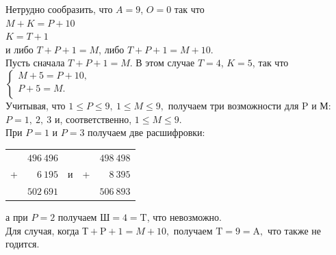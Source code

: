 \documentclass[2pt,twocolumn]{article}
\newcommand\tab[1][1cm]{\hspace*{#1}}
\begin{document}
\begin{flushleft}
\begin{table}[h]
    \endgroup
    \end{table}
    Нетрудно сообразить, что $A = 9$, $O = 0$ так что\\
    \tab \tab $M+K=P+10$\\
    \tab \tab$K = T+1$\\
    и либо $T+P+1=M$, либо $T+P+1=M+10.$\\
    \tab Пусть сначала $T+P+1=M.$ В этом случае $T=4$, $K=5$, так что
    \tab \tab $\left\{
        \begin{array}{ccc}
          M+5=P+10, \\
          P+5=M. \\
        \end{array}
      \right.$\\
    \tab Учитывая, что $1\leq P \leq 9,~1\leq M\leq 9,$ получаем три возможности для P и М: $P=1,~2,~3$ 
    и, соответственно, $1\leq M \leq 9.$\\
    \tab   При $P=1$ и $P=3$ получаем две расшифровки:\\
    \begin{table}[h]
        \begingroup
    \fontsize{7pt}{9pt}\selectfont
        \begin{tabular}{lrllr}
          & $496~496$ &   &   & $498~498$ \\
        + & $6~195$   & и & + & $8~395$   \\ \cline{2-2} \cline{5-5} 
          & $502~691$ &   &   & $506~893$
        \end{tabular}%
        \endgroup
    \end{table}
    а при $P=2$ получаем $\text{Ш} = 4 = \text{T}$, что невозможно.\\
    \tab Для случая, когда $\text{Т}+\text{P}+1=M+10,$ получаем $\text{T}=9=\text{A},$ что также не годится.\\
    \begin{figure}[h!]
        \\

\end{figure}
\end{flushleft}
\end{document}
